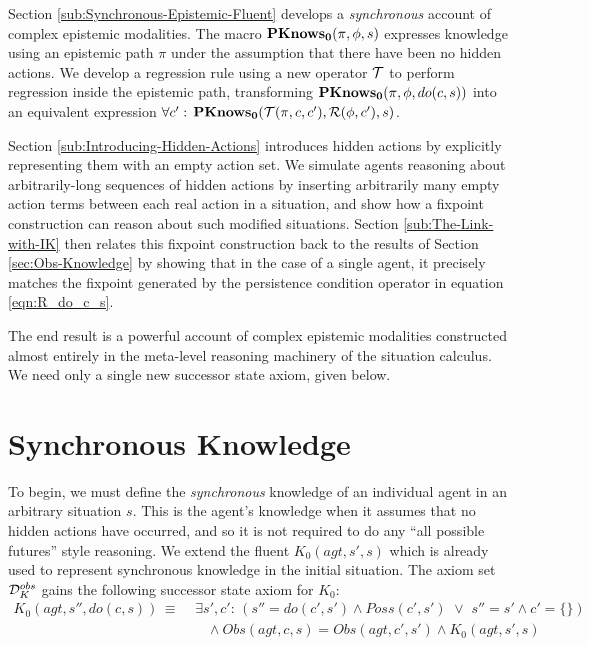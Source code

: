 Section \ref{sub:Synchronous-Epistemic-Fluent} develops a \emph{synchronous}
account of complex epistemic modalities. The macro $\mathbf{PKnows_{0}}(\pi,\phi,s)$
expresses knowledge using an epistemic path $\pi$ under the assumption
that there have been no hidden actions. We develop a regression rule
using a new operator $\mathcal{T}$ to perform regression inside the epistemic
path, transforming $\mathbf{PKnows_{0}}(\pi,\phi,do(c,s))$ into an equivalent
expression $\forall c':\,\mathbf{PKnows_{0}}(\mathcal{T}(\pi,c,c'),\mathcal{R}(\phi,c'),s)$.

Section \ref{sub:Introducing-Hidden-Actions} introduces hidden actions
by explicitly representing them with an empty action set. We simulate
agents reasoning about arbitrarily-long sequences of hidden actions
by inserting arbitrarily many empty action terms between each real
action in a situation, and show how a fixpoint construction can reason
about such modified situations. Section \ref{sub:The-Link-with-IK}
then relates this fixpoint construction back to the results of Section
\ref{sec:Obs-Knowledge} by showing that in the case of a single agent,
it precisely matches the fixpoint generated by the persistence condition
operator in equation \eqref{eqn:R_do_c_s}.

The end result is a powerful account of complex epistemic modalities
constructed almost entirely in the meta-level reasoning machinery
of the situation calculus. We need only a single new successor state
axiom, given below.


\section{Synchronous Knowledge\label{sub:Syncrhonous-Knowledge}}

To begin, we must define the \emph{synchronous} knowledge of an individual
agent in an arbitrary situation $s$. This is the agent's knowledge
when it assumes that no hidden actions have occurred, and so it is
not required to do any {}``all possible futures'' style reasoning.
We extend the fluent $K_{0}(agt,s',s)$ which is already used to represent
synchronous knowledge in the initial situation. The axiom set $\mathcal{D}_{K}^{obs}$
gains the following successor state axiom for $K_{0}$:\begin{align}
K_{0}(agt,s'',do(c,s))\,\equiv\,\, & \exists s',c':\,\left(s''=do(c',s')\wedge Poss(c',s')\,\,\vee\,\, s''=s'\wedge c'=\{\}\right)\nonumber \\
 & \,\,\,\,\,\wedge Obs(agt,c,s)=Obs(agt,c',s')\wedge K_{0}(agt,s',s)\label{eq:K0_ssa}\end{align}


